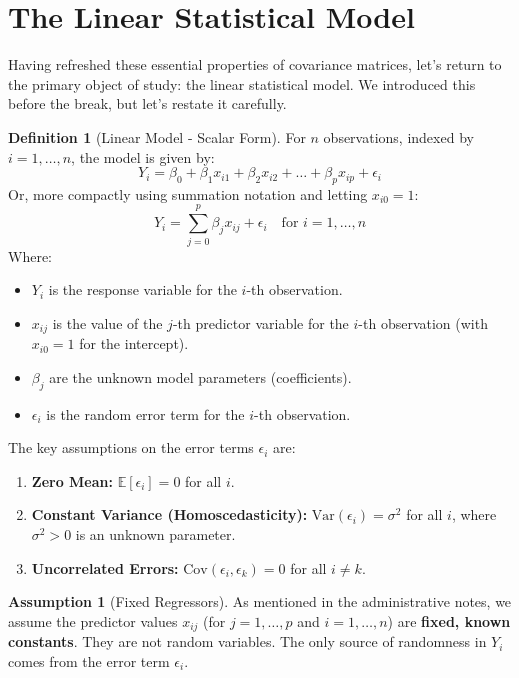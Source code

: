 \documentclass[11pt, letterpaper]{article}
\theoremstyle{definition}
\newtheorem{definition}[theorem]{Definition}
\newtheorem{assumption}[theorem]{Assumption}
\newcommand{\E}{\mathbb{E}}
\newcommand{\Var}{\text{Var}}
\newcommand{\Cov}{\text{Cov}}
\begin{document}
\section{The Linear Statistical Model}

Having refreshed these essential properties of covariance matrices, let's return to the primary object of study: the linear statistical model. We introduced this before the break, but let's restate it carefully.

\begin{definition}[Linear Model - Scalar Form]
For $n$ observations, indexed by $i = 1, \dots, n$, the model is given by:
\[
Y_i = \beta_0 + \beta_1 x_{i1} + \beta_2 x_{i2} + \dots + \beta_p x_{ip} + \epsilon_i
\]
Or, more compactly using summation notation and letting $x_{i0} = 1$:
\[
Y_i = \sum_{j=0}^{p} \beta_j x_{ij} + \epsilon_i \quad \text{for } i = 1, \dots, n
\]
Where:
\begin{itemize}
    \item $Y_i$ is the response variable for the $i$-th observation.
    \item $x_{ij}$ is the value of the $j$-th predictor variable for the $i$-th observation (with $x_{i0}=1$ for the intercept).
    \item $\beta_j$ are the unknown model parameters (coefficients).
    \item $\epsilon_i$ is the random error term for the $i$-th observation.
\end{itemize}
The key assumptions on the error terms $\epsilon_i$ are:
\begin{enumerate}
    \item \textbf{Zero Mean:} $\E[\epsilon_i] = 0$ for all $i$.
    \item \textbf{Constant Variance (Homoscedasticity):} $\Var(\epsilon_i) = \sigma^2$ for all $i$, where $\sigma^2 > 0$ is an unknown parameter.
    \item \textbf{Uncorrelated Errors:} $\Cov(\epsilon_i, \epsilon_k) = 0$ for all $i \neq k$.
\end{enumerate}
\end{definition}

\begin{assumption}[Fixed Regressors]
As mentioned in the administrative notes, we assume the predictor values $x_{ij}$ (for $j=1,\dots,p$ and $i=1,\dots,n$) are \textbf{fixed, known constants}. They are not random variables. The only source of randomness in $Y_i$ comes from the error term $\epsilon_i$.
\end{assumption}
\end{document}
